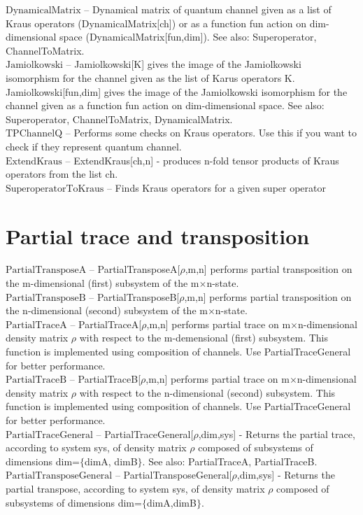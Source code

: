 \documentclass[a4paper,10pt]{scrartcl}
\begin{document}
\noindent\textbf{$ \text{DynamicalMatrix} $ }-- Dynamical matrix of quantum channel given as a list of Kraus operators (DynamicalMatrix[ch]) or as a function fun action on dim-dimensional space (DynamicalMatrix[fun,dim]). See also: Superoperator, ChannelToMatrix.$  $\\[8pt]
\noindent\textbf{$ \text{Jamiolkowski} $ }-- Jamiolkowski[K] gives the image of the Jamiolkowski isomorphism for the channel given as the list of Karus operators K. Jamiolkowski[fun,dim] gives the image of the Jamiolkowski isomorphism for the channel given as a function fun action on dim-dimensional space. See also: Superoperator, ChannelToMatrix, DynamicalMatrix.$  $\\[8pt]
\noindent\textbf{$ \text{TPChannelQ} $ }-- Performs some checks on Kraus operators. Use this if you want to check if they represent quantum channel.$  $\\[8pt]
\noindent\textbf{$ \text{ExtendKraus} $ }-- ExtendKraus[ch,n] - produces n-fold tensor products of Kraus operators from the list ch.$  $\\[8pt]
\noindent\textbf{$ \text{SuperoperatorToKraus} $ }-- Finds Kraus operators for a given super operator$  $\\[8pt]
\section{Partial trace and transposition}

\noindent\textbf{$ \text{PartialTransposeA} $ }-- PartialTransposeA[$\rho $,m,n] performs partial transposition on the m-dimensional (first) subsystem of the m$\times $n-state.$  $\\[8pt]
\noindent\textbf{$ \text{PartialTransposeB} $ }-- PartialTransposeB[$\rho $,m,n] performs partial transposition on the n-dimensional (second) subsystem of the m$\times $n-state.$  $\\[8pt]
\noindent\textbf{$ \text{PartialTraceA} $ }-- PartialTraceA[$\rho $,m,n] performs partial trace on m$\times $n-dimensional density matrix $\rho $ with respect to the m-demensional (first) subsystem. This function is implemented using composition of channels. Use PartialTraceGeneral for better performance.$  $\\[8pt]
\noindent\textbf{$ \text{PartialTraceB} $ }-- PartialTraceB[$\rho $,m,n] performs partial trace on m$\times $n-dimensional density matrix $\rho $ with respect to the n-dimensional (second) subsystem. This function is implemented using composition of channels. Use PartialTraceGeneral for better performance.$  $\\[8pt]
\noindent\textbf{$ \text{PartialTraceGeneral} $ }-- PartialTraceGeneral[$\rho $,dim,sys] - Returns the partial trace, according to system sys, of density matrix $\rho $ composed of subsystems of dimensions dim=$\{$dimA, dimB$\}$. See also: PartialTraceA, PartialTraceB.$  $\\[8pt]
\noindent\textbf{$ \text{PartialTransposeGeneral} $ }-- PartialTransposeGeneral[$\rho $,dim,sys] - Returns the partial transpose, according to system sys, of density matrix $\rho $ composed of subsystems of dimensions dim=$\{$dimA,dimB$\}$. $  $\\[8pt]
\end{document}
